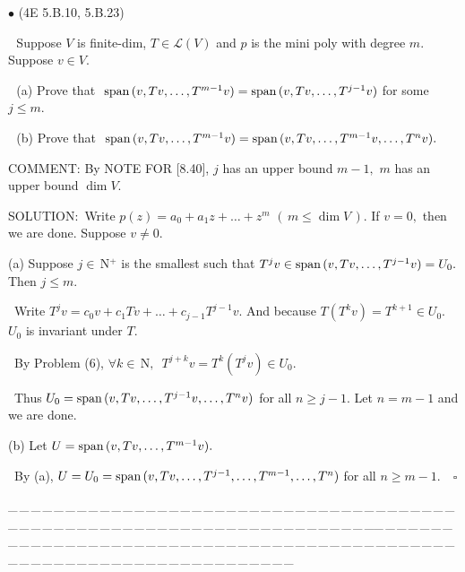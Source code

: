 \documentclass[a4paper, 11pt, UTF8]{article}
\def\Spn{\textup{span}\,}
\def\Lm{\mathcal{L}}
\def\Nbfc{$\,{\timesbf N}$}
\def\Nbp{$\,{\timesbf N}$^+}
\begin{document}
\begin{large}
{\small $\bullet$} ({\normalsize 4E 5.B.10, 5.B.23})\par\,\, {\timessl\Large 
Suppose $V$ is finite-dim, $T\in \Lm(V)$ and $p$ is the mini poly with degree $m.$ Suppose $v\in V.$}\par\,\,
(a) {\timessl\Large Prove that $\,\,\Spn(v,Tv,\dots,T^{m-1}v)=\Spn(v,Tv,\dots,T^{j-1} v)$ for some $j\leq m.$}\par\,\,
(b) {\timessl\Large Prove that $\,\,\Spn(v,Tv,\dots,T^{m-1}v)=\Spn(v, Tv, \dots , T^{m-1} v,\dots,T^n v).$}\par
{\timesbf C{\footnotesize OMMENT:}} By N{\small OTE} F{\small OR} [8.40], $j$ has an upper bound $m-1,$ $m$ has an upper bound $\dim V.$\par
{\timesbf S\footnotesize{OLUTION:}}\,\,\,Write $p(z)=a_0 +a_1 z+\dots+z^m \,\,(\,m\leq \dim V\,).$ If $v=0,$ then we are done. Suppose $v\neq 0.$\par\quad
(a) Suppose $j\in\Nbp$ is the smallest such that $T^j v\in\Spn(v,Tv,\dots,T^{j-1}v)=U_0.$ Then $j\leq m.$\par\qquad\,
Write $T^j v=c_0 v+c_1 Tv+\dots+c_{j-1}T^{j-1}v.$ And because $T(T^k v)=T^{k+1}\in U_0.$ $U_0$ is invariant under $T.$\par\qquad\,
By Problem (6), $\forall k\in\Nbfc,\,\,\,T^{j+k}v=T^k(T^j v)\in U_0.$\par\qquad\,
Thus $U_0=\Spn(v,Tv,\dots,T^{j-1} v,\dots,T^n v)$ for all $n\geq j-1.$ Let $n=m-1$ and we are done.\par\quad
(b) Let $U=\Spn(v,Tv,\dots,T^{m-1}v).$\par\qquad\,
By (a), $U=U_0=\Spn(v,Tv,\dots,T^{j-1},\dots,T^{m-1},\dots,T^n)$ for all $n\geq m-1.\quad\square$\par
{\tiny \_\,\_\,\_\,\_\,\_\,\_\,\_\,\_\,\_\,\_\,\_\,\_\,\_\,\_\,\_\,\_\,\_\,\_\,\_\,\_\,\_\,\_\,\_\,\_\,\_\,\_\,\_\,\_\,\_\,\_\,\_\,\_\,\_\,\_\,\_\,\_\,\_\,\_\,\_\,\_\,\_\,\_\,\_\,\_\,\_\,\_\,\_\,\_\,\_\,\_\,\_\,\_\,\_\,\_\,\_\,\_\,\_\,\_\,\_\,\_\,\_\,\_\,\_\,\_\,\_\,\_\,\_\,\_\,\_\,\_\,\_\_\,\_\,\_\,\_\,\_\,\_\,\_\,\_\,\_\,\_\,\_\,\_\,\_\,\_\,\_\,\_\,\_\,\_\,\_\,\_\,\_\,\_\,\_\,\_\,\_\,\_\,\_\,\_\,\_\,\_\,\_\,\_\,\_\,\_\,\_\,\_\,\_\,\_\,\_\,\_\,\_\,\_\,\_\,\_\,\_\,\_\,\_\,\_\,\_\,\_\,\_\,\_\,\_\,\_\,\_\,\_\,\_\,\_\,\_\,\_\,\_\,\_\,\_\,\_\,\_\,\_\,\_\,\_\,\_\,\_\,\_}\par


\end{large}
\end{document}
